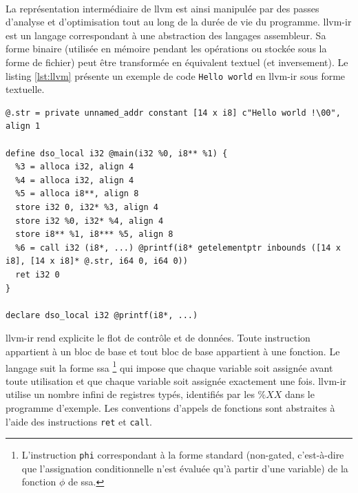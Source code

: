             \paragraph{}
            La représentation intermédiaire de \gls{llvm} est ainsi manipulée par des passes d'analyse et d'optimisation tout au long de la durée de vie du programme. \gls{llvm-ir} est un langage correspondant à une abstraction des langages assembleur. Sa forme binaire (utilisée en mémoire pendant les opérations ou stockée sous la forme de fichier) peut être transformée en équivalent textuel (et inversement). Le listing \ref{lst:llvm} présente un exemple de code \texttt{Hello world} en \gls{llvm-ir} sous forme textuelle. 
        
\begin{center}
\lstset{language=C,style=codeC} 
\begin{lstlisting}[caption=Programme \textit{Hello World!} en IR LLVM (LLVM-9), label=lst:llvm]
@.str = private unnamed_addr constant [14 x i8] c"Hello world !\00", align 1

define dso_local i32 @main(i32 %0, i8** %1) {
  %3 = alloca i32, align 4
  %4 = alloca i32, align 4
  %5 = alloca i8**, align 8
  store i32 0, i32* %3, align 4
  store i32 %0, i32* %4, align 4
  store i8** %1, i8*** %5, align 8
  %6 = call i32 (i8*, ...) @printf(i8* getelementptr inbounds ([14 x i8], [14 x i8]* @.str, i64 0, i64 0))
  ret i32 0
}

declare dso_local i32 @printf(i8*, ...)
\end{lstlisting}
\end{center}

            \gls{llvm-ir} rend explicite le flot de contrôle et de données. Toute instruction appartient à un bloc de base et tout bloc de base appartient à une fonction. Le langage suit la forme \gls{ssa} \cite{ssa} \footnote{L'instruction \texttt{phi} correspondant à la forme standard (non-gated, c'est-à-dire que l'assignation conditionnelle n'est évaluée qu'à partir d'une variable) de la fonction $\phi$ de \gls{ssa}.} 
            qui impose que chaque variable soit assignée avant toute utilisation et que chaque variable soit assignée exactement une fois. \gls{llvm-ir} utilise un nombre infini de registres typés, identifiés par les $\%XX$ dans le programme d'exemple.
            Les conventions d'appels de fonctions sont abstraites à l'aide des instructions \texttt{ret} et \texttt{call}.
            
